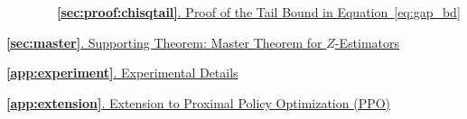 {~~~~~~~~\hyperref[sec:proof:chisqtail]
{\textbf{\ref{sec:proof:chisqtail}}.
Proof of the Tail Bound in Equation~\eqref{eq:gap_bd}}
\dotfill
\pageref{sec:proof:chisqtail}

\hyperref[sec:master]
{\textbf{\ref{sec:master}}.
Supporting Theorem: Master Theorem for $Z$-Estimators}
\dotfill
\pageref{sec:master}

\hyperref[app:experiment]
{\textbf{\ref{app:experiment}}.
Experimental Details}
\dotfill
\pageref{app:experiment}

\hyperref[app:extension]
{\textbf{\ref{app:extension}}.
Extension to Proximal Policy Optimization (PPO)}
\dotfill
\pageref{app:extension}

}



